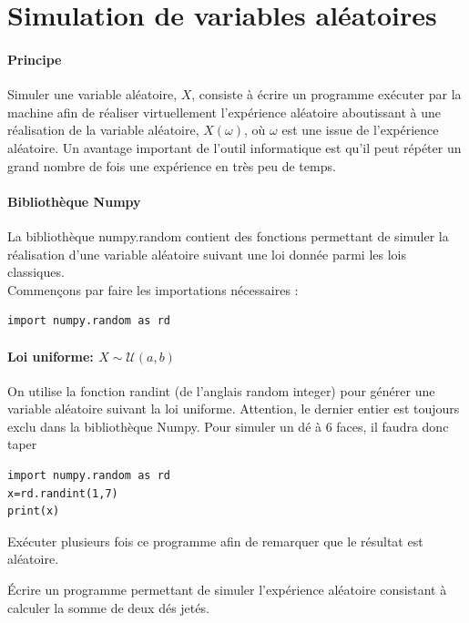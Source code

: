 \documentclass{book}
\begin{document}
\section*{Simulation de variables aléatoires}

\paragraph{Principe}
Simuler une variable aléatoire, $X$, consiste à écrire un programme exécuter par la machine afin de réaliser virtuellement l'expérience
aléatoire aboutissant à une réalisation de la variable aléatoire, $X(\omega)$, où $\omega$ est une issue de l'expérience aléatoire. 
Un avantage important de l'outil informatique est qu'il peut répéter
un grand nombre de fois une expérience en très peu de temps.
\paragraph*{Bibliothèque Numpy}
La bibliothèque numpy.random contient des fonctions permettant de simuler la
réalisation d'une variable aléatoire suivant une loi donnée parmi les lois classiques.\\ 
Commençons par faire les importations nécessaires :
\begin{lstlisting}
import numpy.random as rd
\end{lstlisting}
\paragraph{Loi uniforme: $X\sim\mathcal{U}(a, b)$}
On utilise la fonction randint (de l'anglais random integer) pour générer une variable aléatoire suivant la loi uniforme. Attention, le dernier entier est toujours exclu dans la bibliothèque Numpy. Pour simuler un dé à 6 faces, il faudra donc taper
\begin{lstlisting}
import numpy.random as rd
x=rd.randint(1,7)
print(x)
\end{lstlisting}
Exécuter plusieurs fois ce programme afin de remarquer que le résultat est aléatoire.
\begin{Exercice}
Écrire un programme permettant de simuler l'expérience aléatoire consistant à calculer la somme de deux dés jetés.
\end{Exercice}
\end{document}
